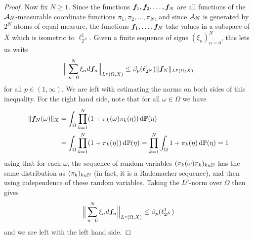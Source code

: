 \begin{proof}
  Now fix $N \geq 1$.
  Since the functions $\bm{f}_{1}, \bm{f}_{2}, \ldots, \bm{f}_{N}$ are all functions of the $\mathcal{A}_{N}$-measurable coordinate functions $\pi_{1}, \pi_{2}, \ldots, \pi_{N}$, and since $\mathcal{A}_{N}$ is generated by $2^{N}$ atoms of equal measure, the functions $\bm{f}_{1}, \ldots, \bm{f}_{N}$ take values in a subspace of $X$ which is isometric to $\ell^1_{2^{N}}$.
  Given a finite sequence of signs $(\xi_{n})_{n=0}^{N}$, this lets us write
  \begin{equation}\label{eq:L1-notUMD-est1}
    \Big\| \sum_{n=0}^{N} \xi_{n} d\bm{f}_{n} \Big\|_{L^p(\Omega;X)} \leq \beta_{p}(\ell^{1}_{2^N}) \| \bm{f}_{N} \|_{L^p(\Omega;X)}
  \end{equation}
  for all $p \in (1,\infty)$.
  We are left with estimating the norms on borh sides of this inequality.
  For the right hand side, note that for all $\omega \in \Omega$ we have
  \begin{equation*}
    \begin{aligned}
      \|\bm{f}_{N}(\omega)\|_{X}
      &= \int_{\Omega} \prod_{k=1}^{N} (1 + \pi_{k}(\omega) \pi_{k}(\eta)) \, \mathrm{d}\mathbb{P}(\eta) \\
      &= \int_{\Omega} \prod_{k=1}^{N} (1 + \pi_{k}(\eta))\, \mathrm{d}\mathbb{P}(\eta) 
      = \prod_{k=1}^{N} \int_{\Omega} 1 + \pi_{k}(\eta) \, \mathrm{d}\mathbb{P}(\eta) = 1
    \end{aligned}
  \end{equation*}
  using that for each $\omega$, the sequence of random variables $(\pi_{k}(\omega) \pi_{k})_{k \in \mathbb{N}}$ has the same distribution as $(\pi_{k})_{k \in \mathbb{N}}$ (in fact, it is a Rademacher sequence), and then using independence of these random variables.
  Taking the $L^p$-norm over $\Omega$ then gives
  \begin{equation*}
    \Big\| \sum_{n=0}^{N} \xi_{n} d\bm{f}_{n} \Big\|_{L^p(\Omega;X)} \leq \beta_{p}(\ell^{1}_{2^N})
  \end{equation*}
  and we are left with the left hand side.
  

\end{proof}
